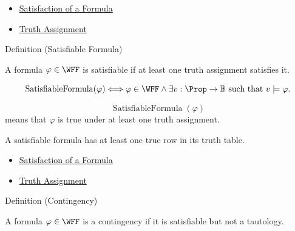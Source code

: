 \begin{dependencies}
\begin{itemize}
  \item \hyperref[def:satisfaction-propositional-formula]{Satisfaction of a Formula}
  \item \hyperref[def:truth-assignment-propositional-logic]{Truth Assignment}
\end{itemize}
\end{dependencies}
\begin{definitionbox}{Definition (Satisfiable Formula)}
\begin{definition}
\label{def:satisfiable-formula-propositional-logic}
A formula \(\varphi\in\WFF\) is satisfiable if at least one truth assignment satisfies it.
\end{definition}
\end{definitionbox}

\begin{remark*}
\[
\operatorname{SatisfiableFormula}(\varphi)
\Longleftrightarrow
\varphi\in\WFF
\land
\exists v:\Prop\to\mathbb{B}\text{ such that }v\models\varphi.
\]
\end{remark*}

\begin{remark*}
\[
\operatorname{SatisfiableFormula}(\varphi)
\]
means that \(\varphi\) is true under at least one truth assignment.
\end{remark*}

\begin{remark*}[Interpretation]
A satisfiable formula has at least one true row in its truth table.
\end{remark*}

\begin{dependencies}
\begin{itemize}
  \item \hyperref[def:satisfaction-propositional-formula]{Satisfaction of a Formula}
  \item \hyperref[def:truth-assignment-propositional-logic]{Truth Assignment}
\end{itemize}
\end{dependencies}
\begin{definitionbox}{Definition (Contingency)}
\begin{definition}[Contingency]
\label{def:contingency-propositional-logic}
A formula \(\varphi\in\WFF\) is a contingency if it is satisfiable but not a tautology.
\end{definition}
\end{definitionbox}

